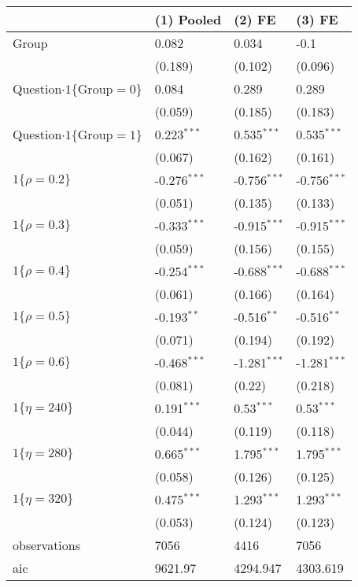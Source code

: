 \begin{tabular}{llll}
\hline
 & (1) Pooled & (2) FE & (3) FE \\
\hline
Group & 0.082 & 0.034 & -0.1 \\
 & (0.189) & (0.102) & (0.096) \\
Question$\cdot1\{\text{Group}=0\}$ & 0.084 & 0.289 & 0.289 \\
 & (0.059) & (0.185) & (0.183) \\
Question$\cdot1\{\text{Group}=1\}$ & 0.223$^{***}$ & 0.535$^{***}$ & 0.535$^{***}$ \\
 & (0.067) & (0.162) & (0.161) \\
$1\{\rho=0.2\}$ & -0.276$^{***}$ & -0.756$^{***}$ & -0.756$^{***}$ \\
 & (0.051) & (0.135) & (0.133) \\
$1\{\rho=0.3\}$ & -0.333$^{***}$ & -0.915$^{***}$ & -0.915$^{***}$ \\
 & (0.059) & (0.156) & (0.155) \\
$1\{\rho=0.4\}$ & -0.254$^{***}$ & -0.688$^{***}$ & -0.688$^{***}$ \\
 & (0.061) & (0.166) & (0.164) \\
$1\{\rho=0.5\}$ & -0.193$^{**}$ & -0.516$^{**}$ & -0.516$^{**}$ \\
 & (0.071) & (0.194) & (0.192) \\
$1\{\rho=0.6\}$ & -0.468$^{***}$ & -1.281$^{***}$ & -1.281$^{***}$ \\
 & (0.081) & (0.22) & (0.218) \\
$1\{\eta=240\}$ & 0.191$^{***}$ & 0.53$^{***}$ & 0.53$^{***}$ \\
 & (0.044) & (0.119) & (0.118) \\
$1\{\eta=280\}$ & 0.665$^{***}$ & 1.795$^{***}$ & 1.795$^{***}$ \\
 & (0.058) & (0.126) & (0.125) \\
$1\{\eta=320\}$ & 0.475$^{***}$ & 1.293$^{***}$ & 1.293$^{***}$ \\
 & (0.053) & (0.124) & (0.123) \\\hline

observations & 7056 & 4416 & 7056 \\
aic & 9621.97 & 4294.947 & 4303.619 \\
\hline
\end{tabular}
